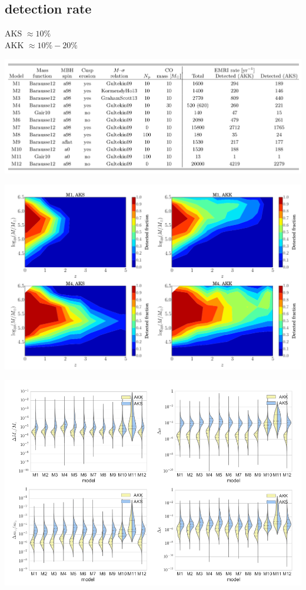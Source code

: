 \subsection{detection rate}
AKS $\approx 10\% $\\
AKK $\approx 10\% - 20\%$

\includegraphics[width=\textwidth]{img/detection_rates.png}

\includegraphics[width=\textwidth]{img/detection_fraction.png}

\includegraphics[width=\textwidth]{img/intristic_parameter_estimation.png}

